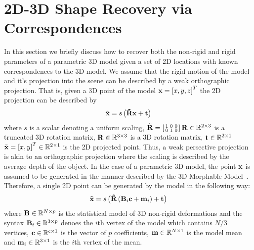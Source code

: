 \section{2D-3D Shape Recovery via Correspondences}\label{sec:face_flow_3d_recovery}
In this section we briefly discuss how to recover both the non-rigid and rigid
parameters of a parametric 3D model given a set of 2D locations with known
correspondences to the 3D model. We assume that the rigid motion of the model
and it's projection into the scene can be described by a weak orthographic
projection. That is, given a 3D point of the model $\boldsymbol{\mathbf{x}} = {[x, y, z]}^T$ the
2D projection can be described by
\begin{equation}
\boldsymbol{\mathbf{\tilde{x}}} = s \left( \boldsymbol{\mathbf{\tilde{R}}} \boldsymbol{\mathbf{x}} + \boldsymbol{\mathbf{t}} \right)
\end{equation}
where $s$ is a scalar denoting a uniform scaling,
$\boldsymbol{\mathbf{\tilde{R}}} = \left[\begin{smallmatrix} 1&0&0\\0&1&0 \end{smallmatrix}\right] \boldsymbol{\mathbf{R}} \in \mathbb{R}^{2 \times 3}$
is a truncated 3D rotation matrix, $\boldsymbol{\mathbf{R}} \in \mathbb{R}^{3 \times 3}$ is a 3D rotation matrix,
$\boldsymbol{\mathbf{t}} \in \mathbb{R}^{2 \times 1}$ 
$\tilde{\boldsymbol{\mathbf{x}}} = {[x, y]}^T \in \mathbb{R}^{2 \times 1}$ is the 2D projected point. 
Thus, a weak persective projection is akin to an orthographic projection where the scaling
is described by the average depth of the object. In the case of a parametric 3D
model, the point $\boldsymbol{\mathbf{x}}$ is assumed to be generated in the manner described
by the 3D Morphable Model~\cite{volker1999morphable}. Therefore, a single 2D
point can be generated by the model in the following way:
\begin{equation}
\boldsymbol{\mathbf{\tilde{x}}} = s \left( \boldsymbol{\mathbf{\tilde{R}}} \left(\boldsymbol{\mathbf{B}}_i \boldsymbol{\mathbf{c}} + \boldsymbol{\mathbf{m}}_i\right) + \boldsymbol{\mathbf{t}} \right)
\end{equation}
where $\boldsymbol{\mathbf{B}} \in \mathbb{R}^{N \times p}$ is the statistical model of 3D non-rigid deformations
and the syntax $\boldsymbol{\mathbf{B}}_i \in \mathbb{R}^{3 \times p}$ denoes the $i$th vertex of the model which
contains $N / 3$ vertices,
$\boldsymbol{\mathbf{c}} \in \mathbb{R}^{c \times 1}$ is the vector of $p$ coefficients,
$\boldsymbol{\mathbf{m}} \in \mathbb{R}^{N \times 1}$ is the model mean and $\boldsymbol{\mathbf{m}}_i \in \mathbb{R}^{3 \times 1}$
is the $i$th vertex of the mean.

